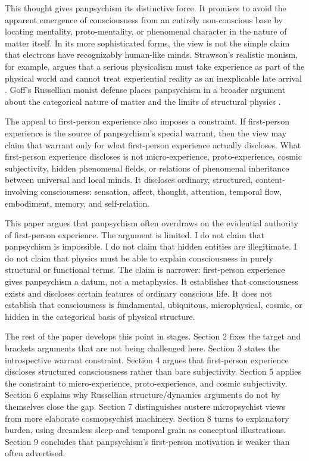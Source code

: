 \documentclass[12pt]{article}
\begin{document}
This thought gives panpsychism its distinctive force. It promises to avoid the apparent emergence of consciousness from an entirely non-conscious base by locating mentality, proto-mentality, or phenomenal character in the nature of matter itself. In its more sophisticated forms, the view is not the simple claim that electrons have recognizably human-like minds. Strawson's realistic monism, for example, argues that a serious physicalism must take experience as part of the physical world and cannot treat experiential reality as an inexplicable late arrival \citep{strawson2006}. Goff's Russellian monist defense places panpsychism in a broader argument about the categorical nature of matter and the limits of structural physics \citep{goff2017cfr}.

The appeal to first-person experience also imposes a constraint. If first-person experience is the source of panpsychism's special warrant, then the view may claim that warrant only for what first-person experience actually discloses. What first-person experience discloses is not micro-experience, proto-experience, cosmic subjectivity, hidden phenomenal fields, or relations of phenomenal inheritance between universal and local minds. It discloses ordinary, structured, content-involving consciousness: sensation, affect, thought, attention, temporal flow, embodiment, memory, and self-relation.

This paper argues that panpsychism often overdraws on the evidential authority of first-person experience. The argument is limited. I do not claim that panpsychism is impossible. I do not claim that hidden entities are illegitimate. I do not claim that physics must be able to explain consciousness in purely structural or functional terms. The claim is narrower: first-person experience gives panpsychism a datum, not a metaphysics. It establishes that consciousness exists and discloses certain features of ordinary conscious life. It does not establish that consciousness is fundamental, ubiquitous, microphysical, cosmic, or hidden in the categorical basis of physical structure.

The rest of the paper develops this point in stages. Section 2 fixes the target and brackets arguments that are not being challenged here. Section 3 states the introspective warrant constraint. Section 4 argues that first-person experience discloses structured consciousness rather than bare subjectivity. Section 5 applies the constraint to micro-experience, proto-experience, and cosmic subjectivity. Section 6 explains why Russellian structure/dynamics arguments do not by themselves close the gap. Section 7 distinguishes austere micropsychist views from more elaborate cosmopsychist machinery. Section 8 turns to explanatory burden, using dreamless sleep and temporal grain as conceptual illustrations. Section 9 concludes that panpsychism's first-person motivation is weaker than often advertised.
\end{document}
